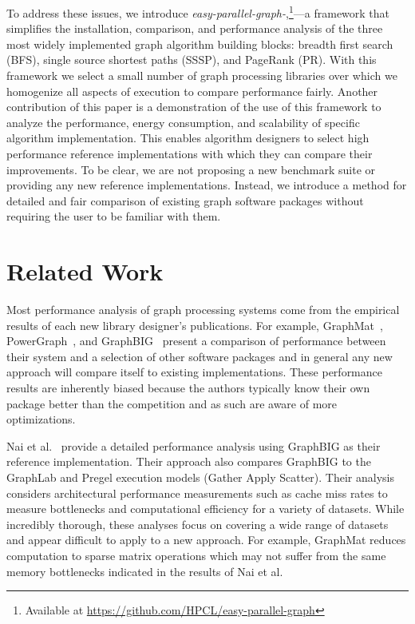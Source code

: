 \documentclass[conference]{IEEEtran}
\begin{document}
To address these issues, we introduce \mbox{\emph{easy-parallel-graph-\textasteriskcentered}},\footnote{Available at \url{https://github.com/HPCL/easy-parallel-graph}}---a framework that simplifies the installation, comparison, and performance analysis of the three most widely implemented graph algorithm building blocks: breadth first search (BFS), single source shortest paths (SSSP), and PageRank (PR). With this framework we select a small number of graph processing libraries over which we homogenize all aspects of execution to compare performance fairly. Another contribution of this paper is a demonstration of the use of this framework to analyze the performance, energy consumption, and scalability of specific algorithm implementation. This enables algorithm designers to select high performance reference implementations with which they can compare their improvements. To be clear, we are not proposing a new benchmark suite or providing any new reference implementations. Instead, we introduce a method for detailed and fair comparison of existing graph software packages without requiring the user to be familiar with them.

\section{Related Work}\label{sec:relatedwork}
Most performance analysis of graph processing systems come from the empirical results of each new library designer's publications. For example, GraphMat~\cite{Sundaram:2015:GraphMat}, PowerGraph~\cite{Gonzalez:2012:Powergraph}, and GraphBIG~\cite{Nai:2015:Graphbig} present a comparison of performance between their system and a selection of other software packages and in general any new approach will compare itself to existing implementations. These performance results are inherently biased because the authors typically know their own package better than the competition and as such are aware of more optimizations.

Nai et al.~\cite{Nai:2016:architectural} provide a detailed performance analysis using GraphBIG as their reference implementation. Their approach also compares GraphBIG to the GraphLab and Pregel execution models (Gather Apply Scatter). Their analysis considers architectural performance measurements such as cache miss rates to measure bottlenecks and computational efficiency for a variety of datasets. While incredibly thorough, these analyses focus on covering a wide range of datasets and appear difficult to apply to a new approach. For example, GraphMat reduces computation to sparse matrix operations which may not suffer from the same memory bottlenecks indicated in the results of Nai et al.
\end{document}

